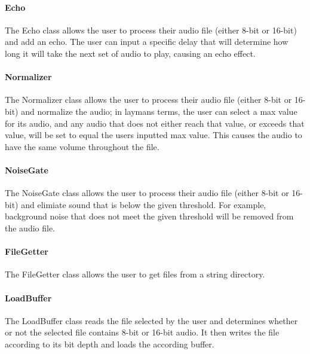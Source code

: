 \paragraph*{Echo}

The {\ttfamily Echo} class allows the user to process their audio file (either 8-\/bit or 16-\/bit) and add an echo. The user can input a specific {\ttfamily delay} that will determine how long it will take the next set of audio to play, causing an echo effect.

\paragraph*{Normalizer}

The {\ttfamily Normalizer} class allows the user to process their audio file (either 8-\/bit or 16-\/bit) and normalize the audio; in layman\textquotesingle{}s terms, the user can select a max value for its audio, and any audio that does not either reach that value, or exceeds that value, will be set to equal the user\textquotesingle{}s inputted max value. This causes the audio to have the same volume throughout the file.

\paragraph*{Noise\+Gate}

The {\ttfamily Noise\+Gate} class allows the user to process their audio file (either 8-\/bit or 16-\/bit) and elimiate sound that is below the given threshold. For example, background noise that does not meet the given threshold will be removed from the audio file.

\paragraph*{File\+Getter}

The {\ttfamily File\+Getter} class allows the user to get files from a string directory.

\paragraph*{Load\+Buffer}

The {\ttfamily Load\+Buffer} class reads the file selected by the user and determines whether or not the selected file contains 8-\/bit or 16-\/bit audio. It then writes the file according to its bit depth and loads the according buffer.

